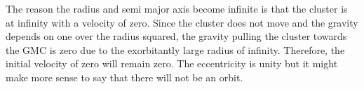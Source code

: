 \documentclass{aa}
\begin{document}
The reason the radius and semi major axis become infinite is that the cluster is at infinity with a velocity of zero. Since the cluster does not move and the gravity depends on one over the radius squared, the gravity pulling the cluster towards the GMC is zero due to the exorbitantly large radius of infinity. Therefore, the initial velocity of zero will remain zero. The eccentricity is unity but it might make more sense to say that there will not be an orbit.
% 
% 
% 
% 



\end{document}
